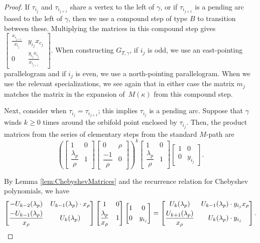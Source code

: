 \begin{proof}
If $\tau_{i_j}$ and $\tau_{i_{j+1}}$ share a vertex to the left of $\gamma$, or if $\tau_{i_{j+1}}$ is a pending arc based to the left of $\gamma$, then we use a compound step of type $B$ to transition between these. Multiplying the matrices in this compound step gives $\left[\begin{smallmatrix} \frac{x_{i_{j+1}}}{x_{i_j}} & y_{i_j}x_{c_j} \\ 0 & \frac{y_{i_j}x_{i_j}}{x_{i_{j+1}}} \end{smallmatrix}\right] $. When constructing $G_{T,\gamma}$, if $i_j$ is odd, we use an east-pointing parallelogram and if $i_j$ is even, we use a north-pointing parallelogram. When we use the relevant specializations, we see again that in either case the matrix $m_j$ matches the matrix in the expansion of~$M(\kappa)$ from this compound step.

Next, consider when $\tau_{i_j} = \tau_{i_{j+1}}$; this implies $\tau_{i_j}$ is a pending arc. Suppose that $\gamma$ winds $k \geq 0$ times around the orbifold point enclosed by $\tau_{i_j}$. Then, the product matrices from the series of elementary steps from the standard $M$-path are \[
\left( \begin{bmatrix} 1 & 0 \\ \dfrac{\lambda_p}{\rho} & 1 \end{bmatrix} \begin{bmatrix} 0 & \rho \\ \dfrac{-1}{\rho} & 0 \end{bmatrix} \right)^k \begin{bmatrix} 1 & 0 \\ \dfrac{\lambda_p}{\rho} & 1 \end{bmatrix} \begin{bmatrix} 1 & 0 \\ 0 & y_{i_j} \end{bmatrix}.
\]

By Lemma \ref{lem:ChebyshevMatrices} and the recurrence relation for Chebyshev polynomials, we have \[
\begin{bmatrix} -U_{k-2} (\lambda_p) & U_{k-1}(\lambda_p) \cdot x_\rho \vspace{1mm}\\ \dfrac{-U_{k-1}(\lambda_p)}{x_\rho} & U_k(\lambda_p) \end{bmatrix} \begin{bmatrix} 1 & 0 \vspace{1mm}\\ \dfrac{\lambda_p}{x_\rho} & 1 \end{bmatrix} \begin{bmatrix} 1 & 0 \vspace{1mm}\\ 0 & y_{i_j} \end{bmatrix} = \begin{bmatrix} U_k(\lambda_p) & U_{k-1}(\lambda_p) \cdot y_{i_j} x_\rho \vspace{1mm}\\ \dfrac{U_{k+1}(\lambda_p)}{x_\rho} & U_k(\lambda_p) \cdot y_{i_j} \end{bmatrix}.
\]


\end{proof}
